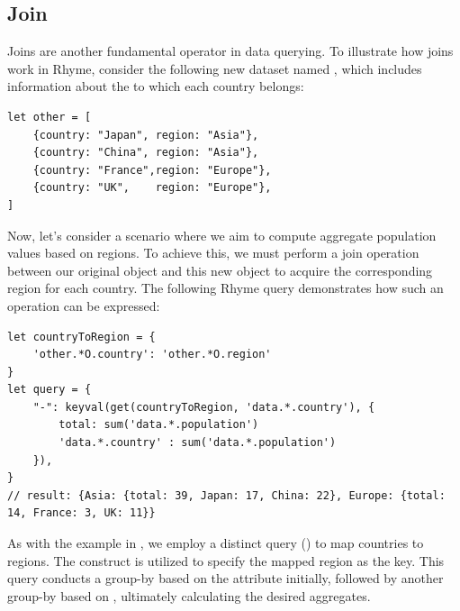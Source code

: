 \documentclass[runningheads]{llncs}
\newcommand{\lang}{Rhyme}
\begin{document}
\subsection{Join}
Joins are another fundamental operator in data querying.
To illustrate how joins work in \lang{}, consider the following
new dataset named , which includes information about the
 to which each country belongs:

\begin{lstlisting}[style=JavaScript, columns=flexible]
let other = [
    {country: "Japan", region: "Asia"},
    {country: "China", region: "Asia"},
    {country: "France",region: "Europe"},
    {country: "UK",    region: "Europe"},
]
\end{lstlisting}

Now, let's consider a scenario where we aim to compute aggregate population
values based on regions.
To achieve this, we must perform a join operation between our original
 object and this new  object to acquire the
corresponding region for each country.
The following \lang{} query demonstrates how such an operation can be
expressed:

\begin{lstlisting}[style=JavaScript, columns=flexible]
let countryToRegion = {
    'other.*O.country': 'other.*O.region'
}
let query = {
    "-": keyval(get(countryToRegion, 'data.*.country'), {
        total: sum('data.*.population')
        'data.*.country' : sum('data.*.population')
    }),
}
// result: {Asia: {total: 39, Japan: 17, China: 22}, Europe: {total: 14, France: 3, UK: 11}}
\end{lstlisting}

As with the example in , we employ a distinct query
() to map countries to regions.
The  construct is utilized to specify the mapped region
as the key.
This query conducts a group-by based on the  attribute initially,
followed by another group-by based on , ultimately calculating the
desired aggregates.

\end{document}
